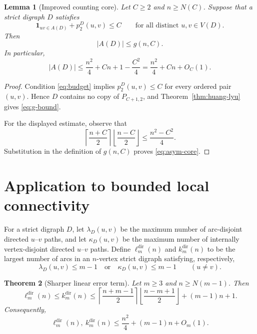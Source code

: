 \documentclass[10pt]{amsart}
\newtheorem{theorem}{Theorem}
\newtheorem{lemma}[theorem]{Lemma}
\theoremstyle{remark}
\newcommand{\ind}{\mathbf 1}
\newcommand{\ldir}{\ell^{\mathrm{dir}}}
\newcommand{\kdir}{k^{\mathrm{dir}}}
\begin{document}
\begin{lemma}[Improved counting core]
\label{lem:core}
Let $C\ge2$ and $n\ge N(C)$.  Suppose that a strict digraph $D$ satisfies
\begin{equation}
\label{eq:budget}
  \ind_{uv\in A(D)}+p_2^D(u,v)\le C
  \qquad\text{for all distinct }u,v\in V(D).
\end{equation}
Then
\begin{equation}
\label{eq:g-bound}
 |A(D)|\le g(n,C).
\end{equation}
In particular,
\begin{equation}
\label{eq:asym-core}
 |A(D)|
 \le \frac{n^2}{4}+Cn+1-\frac{C^2}{4}
 =\frac{n^2}{4}+Cn+O_C(1).
\end{equation}
\end{lemma}

\begin{proof}
Condition \eqref{eq:budget} implies $p_2^D(u,v)\le C$ for every ordered
pair $(u,v)$.  Hence $D$ contains no copy of $P_{C+1,2}$, and
Theorem~\ref{thm:huang-lyu} gives \eqref{eq:g-bound}.

For the displayed estimate, observe that
\[
 \left\lceil\frac{n+C}{2}\right\rceil
 \left\lfloor\frac{n-C}{2}\right\rfloor
 \le \frac{n^2-C^2}{4}.
\]
Substitution in the definition of $g(n,C)$ proves \eqref{eq:asym-core}.
\end{proof}

\section{Application to bounded local connectivity}

For a strict digraph $D$, let $\lambda_D(u,v)$ be the maximum number of
arc-disjoint directed $u$--$v$ paths, and let $\kappa_D(u,v)$ be the maximum
number of internally vertex-disjoint directed $u$--$v$ paths.  Define
$\ldir_m(n)$ and $\kdir_m(n)$ to be the largest number of arcs in an
$n$-vertex strict digraph satisfying, respectively,
\[
 \lambda_D(u,v)\le m-1
 \quad\text{or}\quad
 \kappa_D(u,v)\le m-1
 \qquad (u\ne v).
\]

\begin{theorem}[Sharper linear error term]
\label{thm:main}
Let $m\ge3$ and $n\ge N(m-1)$.  Then
\begin{equation}
\label{eq:main-exact}
 \ldir_m(n)\le \kdir_m(n)
 \le
 \left\lceil\frac{n+m-1}{2}\right\rceil
 \left\lfloor\frac{n-m+1}{2}\right\rfloor
 +(m-1)n+1.
\end{equation}
Consequently,
\begin{equation}
\label{eq:main-asym}
 \ldir_m(n),\ \kdir_m(n)
 \le
 \frac{n^2}{4}+(m-1)n+O_m(1).
\end{equation}
\end{theorem}
\end{document}
